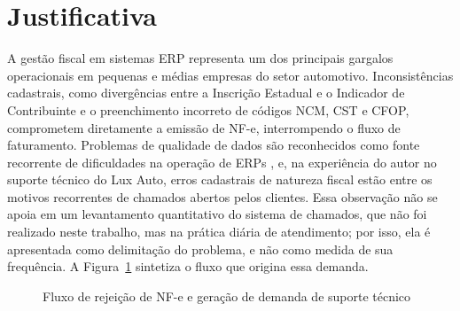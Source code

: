 \section{Justificativa}

A gestão fiscal em sistemas ERP representa um dos principais gargalos operacionais em pequenas e médias empresas do setor automotivo. Inconsistências cadastrais, como divergências entre a Inscrição Estadual e o Indicador de Contribuinte e o preenchimento incorreto de códigos NCM, CST e CFOP, comprometem diretamente a emissão de NF-e, interrompendo o fluxo de faturamento. Problemas de qualidade de dados são reconhecidos como fonte recorrente de dificuldades na operação de ERPs \cite{xu2002}, e, na experiência do autor no suporte técnico do Lux Auto, erros cadastrais de natureza fiscal estão entre os motivos recorrentes de chamados abertos pelos clientes. Essa observação não se apoia em um levantamento quantitativo do sistema de chamados, que não foi realizado neste trabalho, mas na prática diária de atendimento; por isso, ela é apresentada como delimitação do problema, e não como medida de sua frequência. A Figura~\ref{fig:fluxo_rejeicao} sintetiza o fluxo que origina essa demanda.

\begin{figure}[H]
    \centering
    \caption{Fluxo de rejeição de NF-e e geração de demanda de suporte técnico}
    \label{fig:fluxo_rejeicao}
\end{figure}

